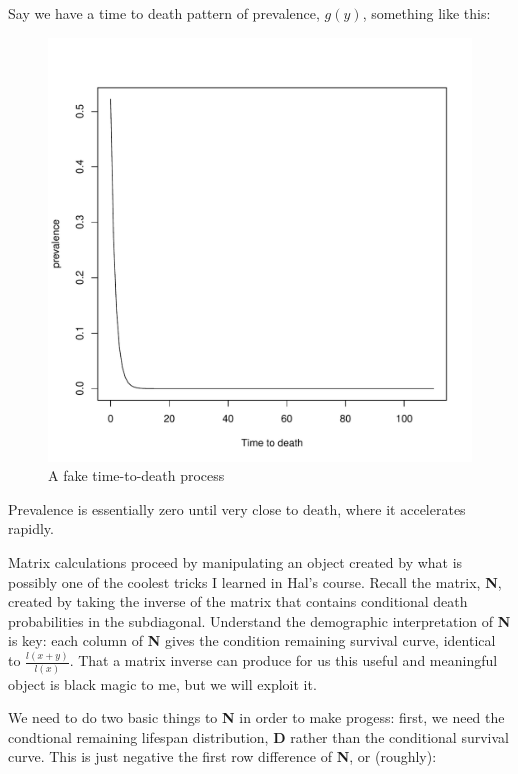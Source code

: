 \documentclass[11pt,oneside,a4paper]{article} %
\begin{document}
 Say we have a time to death pattern of prevalence, $g(y)$, something like this:
 \begin{figure}
	\centering
	\includegraphics[scale=.7]{Figures/gyTim.pdf}
	\caption{A fake time-to-death process}
	\label{fig:gy}
\end{figure}
Prevalence is essentially zero until very close to death, where it accelerates
rapidly. 

Matrix calculations proceed by manipulating an object created by what is
possibly one of the coolest tricks I learned in Hal's course. Recall the matrix,
\textbf{N}, created by taking the inverse of the matrix that contains
conditional death probabilities in the subdiagonal. Understand the demographic
interpretation of \textbf{N} is key: each column of \textbf{N} gives the
condition remaining survival curve, identical to $\frac{l(x+y)}{l(x)}$. That a
matrix inverse can produce for us this useful and meaningful object is black
magic to me, but we will exploit it.

We need to do two basic things to \textbf{N} in order to make progess: first, we
need the condtional remaining lifespan distribution, \textbf{D} rather than the
conditional survival curve. This is just negative the first row difference of \textbf{N},
or (roughly):
\end{document}
